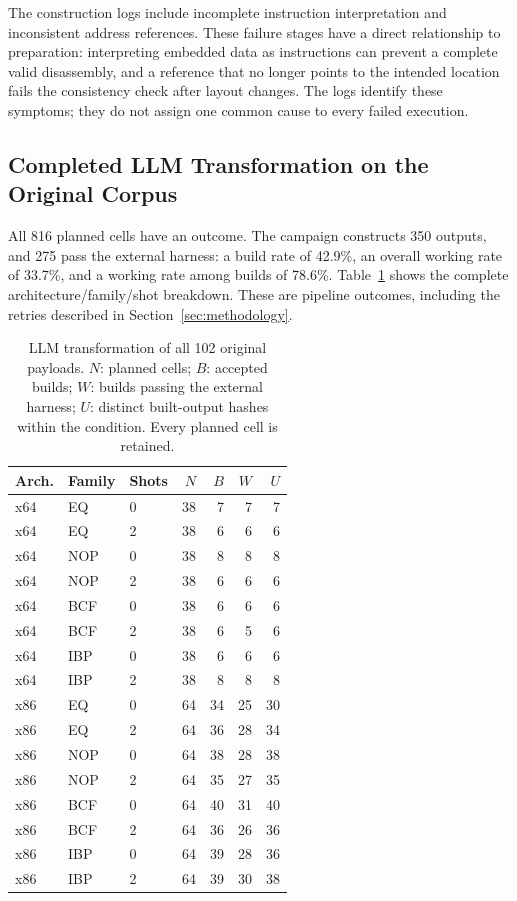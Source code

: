 The construction logs include incomplete instruction interpretation and
inconsistent address references. These failure stages have a direct
relationship to preparation: interpreting embedded data as instructions
can prevent a complete valid disassembly, and a reference that no longer
points to the intended location fails the consistency check after layout
changes. The logs identify these symptoms; they do not assign one common
cause to every failed execution.

\subsection{Completed LLM Transformation on the Original Corpus}
All 816 planned cells have an outcome. The campaign constructs 350
outputs, and 275 pass the external harness: a build rate of 42.9\%, an
overall working rate of 33.7\%, and a working rate among builds of 78.6\%.
Table~\ref{tab:payload_llm} shows the complete architecture/family/shot
breakdown. These are pipeline outcomes, including the retries described
in Section~\ref{sec:methodology}.


\begin{table}[t]
\caption{LLM transformation of all 102 original payloads. $N$: planned cells; $B$: accepted
builds; $W$: builds passing the external harness; $U$: distinct built-output
hashes within the condition. Every planned cell is retained.}
\label{tab:payload_llm}
\centering\small
\begin{tabular}{@{}lllrrrr@{}}
\toprule
Arch. & Family & Shots & $N$ & $B$ & $W$ & $U$ \\
\midrule
x64 & EQ & 0 & 38 & 7 & 7 & 7 \\
x64 & EQ & 2 & 38 & 6 & 6 & 6 \\
x64 & NOP & 0 & 38 & 8 & 8 & 8 \\
x64 & NOP & 2 & 38 & 6 & 6 & 6 \\
x64 & BCF & 0 & 38 & 6 & 6 & 6 \\
x64 & BCF & 2 & 38 & 6 & 5 & 6 \\
x64 & IBP & 0 & 38 & 6 & 6 & 6 \\
x64 & IBP & 2 & 38 & 8 & 8 & 8 \\
\midrule
x86 & EQ & 0 & 64 & 34 & 25 & 30 \\
x86 & EQ & 2 & 64 & 36 & 28 & 34 \\
x86 & NOP & 0 & 64 & 38 & 28 & 38 \\
x86 & NOP & 2 & 64 & 35 & 27 & 35 \\
x86 & BCF & 0 & 64 & 40 & 31 & 40 \\
x86 & BCF & 2 & 64 & 36 & 26 & 36 \\
x86 & IBP & 0 & 64 & 39 & 28 & 36 \\
x86 & IBP & 2 & 64 & 39 & 30 & 38 \\
\bottomrule
\end{tabular}
\end{table}



